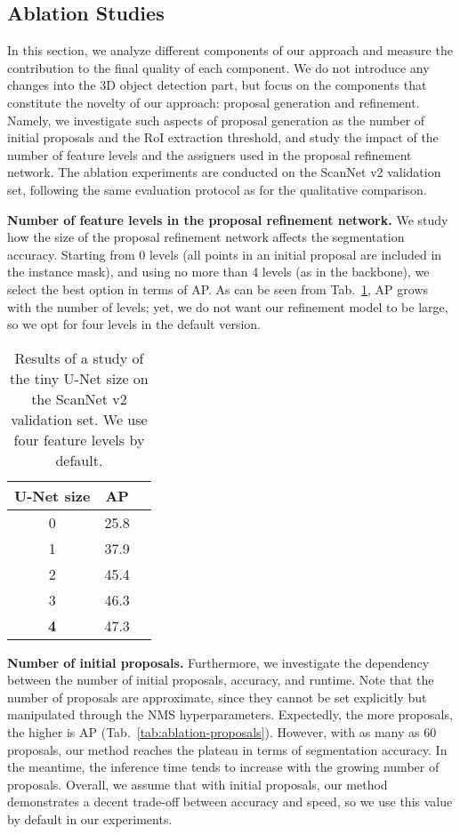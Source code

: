 \documentclass[10pt,twocolumn,letterpaper]{article}
\newcommand\inline{\noindent\textbf}
\begin{document}
\subsection{Ablation Studies}
\label{ssec:ablation}

In this section, we analyze different components of our approach and measure the contribution to the final quality of each component. We do not introduce any changes into the 3D object detection part, but focus on the components that constitute the novelty of our approach: proposal generation and refinement. Namely, we investigate such aspects of proposal generation as the number of initial proposals and the RoI extraction threshold, and study the impact of the number of feature levels and the assigners used in the proposal refinement network. The ablation experiments are conducted on the ScanNet v2 validation set, following the same evaluation protocol as for the qualitative comparison.

\inline{Number of feature levels in the proposal refinement network.} We study how the size of the proposal refinement network affects the segmentation accuracy. Starting from 0 levels (all points in an initial proposal are included in the instance mask), and using no more than 4 levels (as in the backbone), we select the best option in terms of AP. As can be seen from Tab.~\ref{tab:ablation-unet}, AP grows with the number of levels; yet, we do not want our refinement model to be large, so we opt for four levels in the default version.

\begin{table}[h!]
    \centering
\begin{tabular}{ccc}
        \toprule
        U-Net size & AP \\
        \midrule
        0 & 25.8 \\
        1 & 37.9 \\
        2 & 45.4 \\
        3 & 46.3 \\
        \textbf{4} & 47.3 \\
        \bottomrule
    \end{tabular}
    \caption{Results of a study of the tiny U-Net size on the ScanNet v2 validation set. We use four feature levels by default.}
    \label{tab:ablation-unet}
\end{table}

\inline{Number of initial proposals.} Furthermore, we investigate the dependency between the number of initial proposals, accuracy, and runtime. Note that the number of proposals are approximate, since they cannot be set explicitly but manipulated through the NMS hyperparameters. 
Expectedly, the more proposals, the higher is AP (Tab.~\ref{tab:ablation-proposals}). However, with as many as 60 proposals, our method reaches the plateau in terms of segmentation accuracy. In the meantime, the inference time tends to increase with the growing number of proposals. Overall, we assume that with  initial proposals, our method demonstrates a decent trade-off between accuracy and speed, so we use this value by default in our experiments.
\end{document}
